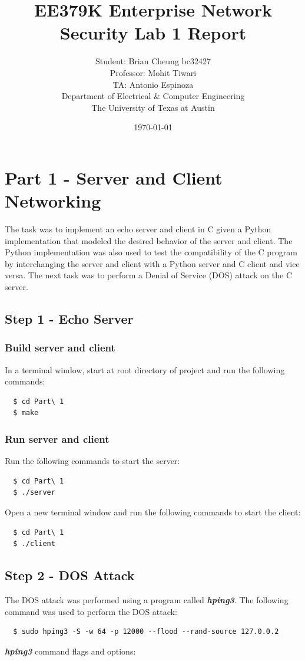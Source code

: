 \documentclass[11pt]{article}
\author{Student: Brian Cheung bc32427 \\ Professor: Mohit Tiwari \\ TA: Antonio Espinoza \\ Department of Electrical \& Computer Engineering \\ The University of Texas at Austin}
\date{\today}
\title{EE379K Enterprise Network Security Lab 1 Report}
\begin{document}
\maketitle
\newpage
\section*{Part 1 - Server and Client Networking}
\label{sec:part-1}
The task was to implement an echo server and client in C given a Python implementation that modeled the desired behavior of the server and client.
The Python implementation was also used to test the compatibility of the C program by interchanging the server and client with a Python server and C client and vice versa.
The next task was to perform a Denial of Service (DOS) attack on the C server.
\subsection*{Step 1 - Echo Server}
\subsubsection*{Build server and client}
In a terminal window, start at root directory of project and run the following commands:
\begin{verbatim}
  $ cd Part\ 1
  $ make
\end{verbatim}
\subsubsection*{Run server and client}
Run the following commands to start the server:
\begin{verbatim}
  $ cd Part\ 1
  $ ./server
\end{verbatim}
Open a new terminal window and run the following commands to start the client:
\begin{verbatim}
  $ cd Part\ 1
  $ ./client
\end{verbatim}
\subsection*{Step 2 - DOS Attack}
The DOS attack was performed using a program called \textbf{\emph{hping3}}.
\noindent The following command was used to perform the DOS attack:
\begin{verbatim}
  $ sudo hping3 -S -w 64 -p 12000 --flood --rand-source 127.0.0.2
\end{verbatim}
\textbf{\emph{hping3}} command flags and options:
\end{document}
